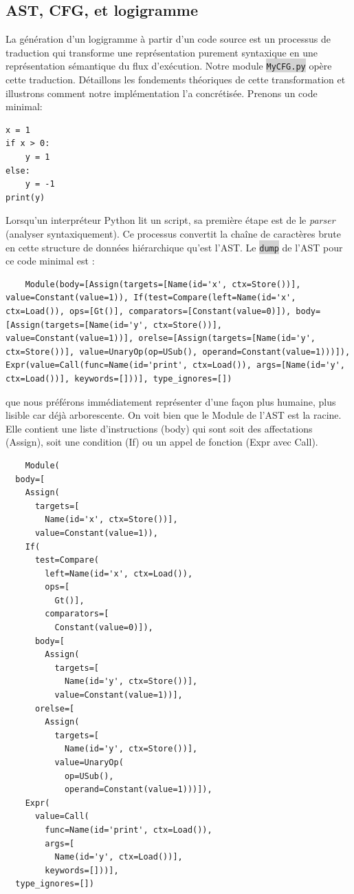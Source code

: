 \documentclass[11pt,a4paper]{article}
\newcommand{\code}[1]{\colorbox{lightgray}{\texttt{\small #1}}}
\begin{document}
\subsection{AST, CFG, et logigramme}
La génération d'un logigramme à partir d'un code source est un processus de traduction qui transforme une 
représentation purement syntaxique en une représentation sémantique du flux d'exécution. Notre module 
\code{MyCFG.py} opère cette traduction. Détaillons les fondements théoriques de cette transformation et illustrons 
comment notre implémentation l'a concrétisée.
\hline
Prenons un code minimal:
\begin{verbatim}
x = 1
if x > 0:
    y = 1
else:
    y = -1
print(y)
\end{verbatim}
Lorsqu'un interpréteur Python lit un script, sa première étape est de le \textit{parser} (analyser syntaxiquement). 
Ce processus convertit la chaîne de caractères brute en cette structure de données hiérarchique qu'est l'AST.
Le \code{dump} de l'AST pour ce code minimal est :
\begin{verbatim}
    Module(body=[Assign(targets=[Name(id='x', ctx=Store())], value=Constant(value=1)), If(test=Compare(left=Name(id='x', ctx=Load()), ops=[Gt()], comparators=[Constant(value=0)]), body=[Assign(targets=[Name(id='y', ctx=Store())], value=Constant(value=1))], orelse=[Assign(targets=[Name(id='y', ctx=Store())], value=UnaryOp(op=USub(), operand=Constant(value=1)))]), Expr(value=Call(func=Name(id='print', ctx=Load()), args=[Name(id='y', ctx=Load())], keywords=[]))], type_ignores=[])
\end{verbatim}
que nous préférons immédiatement représenter d'une façon plus humaine, plus lisible car déjà arborescente. 
On voit bien que le Module de l'AST est la racine. Elle contient une liste d'instructions (body) qui sont soit des
 affectations (Assign), soit une condition (If) ou un appel de fonction (Expr avec Call).
\begin{verbatim}
    Module(
  body=[
    Assign(
      targets=[
        Name(id='x', ctx=Store())],
      value=Constant(value=1)),
    If(
      test=Compare(
        left=Name(id='x', ctx=Load()),
        ops=[
          Gt()],
        comparators=[
          Constant(value=0)]),
      body=[
        Assign(
          targets=[
            Name(id='y', ctx=Store())],
          value=Constant(value=1))],
      orelse=[
        Assign(
          targets=[
            Name(id='y', ctx=Store())],
          value=UnaryOp(
            op=USub(),
            operand=Constant(value=1)))]),
    Expr(
      value=Call(
        func=Name(id='print', ctx=Load()),
        args=[
          Name(id='y', ctx=Load())],
        keywords=[]))],
  type_ignores=[])
\end{verbatim}
\end{document}
